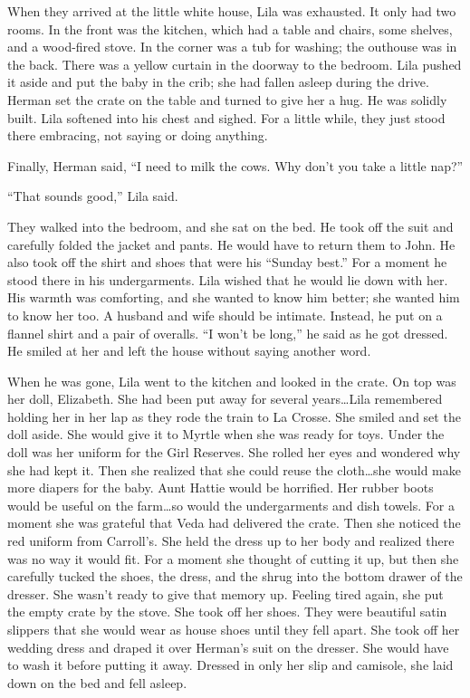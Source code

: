 \documentclass[
  letterpaper,
]{book}
\begin{document}
When they arrived at the little white house, Lila was exhausted. It only
had two rooms. In the front was the kitchen, which had a table and
chairs, some shelves, and a wood-fired stove. In the corner was a tub
for washing; the outhouse was in the back. There was a yellow curtain in
the doorway to the bedroom. Lila pushed it aside and put the baby in the
crib; she had fallen asleep during the drive. Herman set the crate on
the table and turned to give her a hug. He was solidly built. Lila
softened into his chest and sighed. For a little while, they just stood
there embracing, not saying or doing anything.

Finally, Herman said, ``I need to milk the cows. Why don't you take a
little nap?''

``That sounds good,'' Lila said.

They walked into the bedroom, and she sat on the bed. He took off the
suit and carefully folded the jacket and pants. He would have to return
them to John. He also took off the shirt and shoes that were his
``Sunday best.'' For a moment he stood there in his undergarments. Lila
wished that he would lie down with her. His warmth was comforting, and
she wanted to know him better; she wanted him to know her too. A husband
and wife should be intimate. Instead, he put on a flannel shirt and a
pair of overalls. ``I won't be long,'' he said as he got dressed. He
smiled at her and left the house without saying another word.

When he was gone, Lila went to the kitchen and looked in the crate. On
top was her doll, Elizabeth. She had been put away for several
years\ldots Lila remembered holding her in her lap as they rode the
train to La Crosse. She smiled and set the doll aside. She would give it
to Myrtle when she was ready for toys. Under the doll was her uniform
for the Girl Reserves. She rolled her eyes and wondered why she had kept
it. Then she realized that she could reuse the cloth\ldots she would
make more diapers for the baby. Aunt Hattie would be horrified. Her
rubber boots would be useful on the farm\ldots so would the
undergarments and dish towels. For a moment she was grateful that Veda
had delivered the crate. Then she noticed the red uniform from
Carroll's. She held the dress up to her body and realized there was no
way it would fit. For a moment she thought of cutting it up, but then
she carefully tucked the shoes, the dress, and the shrug into the bottom
drawer of the dresser. She wasn't ready to give that memory up. Feeling
tired again, she put the empty crate by the stove. She took off her
shoes. They were beautiful satin slippers that she would wear as house
shoes until they fell apart. She took off her wedding dress and draped
it over Herman's suit on the dresser. She would have to wash it before
putting it away. Dressed in only her slip and camisole, she laid down on
the bed and fell asleep.
\end{document}
